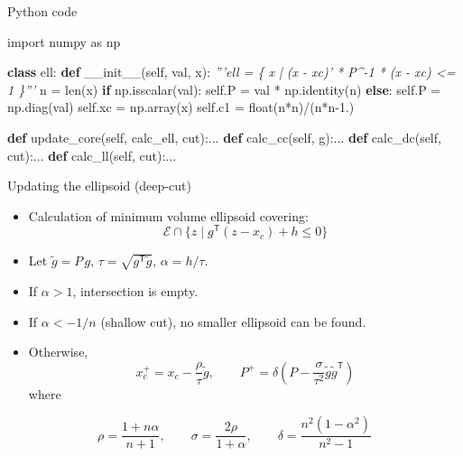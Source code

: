 \documentclass[10pt,ignorenonframetext,serif,onlymath]{beamer}
\newenvironment{Shaded}{}{}
\newcommand{\BuiltInTok}[1]{#1}
\newcommand{\CommentTok}[1]{\textcolor[rgb]{0.38,0.63,0.69}{\textit{#1}}}
\newcommand{\ControlFlowTok}[1]{\textcolor[rgb]{0.00,0.44,0.13}{\textbf{#1}}}
\newcommand{\FloatTok}[1]{\textcolor[rgb]{0.25,0.63,0.44}{#1}}
\newcommand{\FunctionTok}[1]{\textcolor[rgb]{0.02,0.16,0.49}{#1}}
\newcommand{\ImportTok}[1]{#1}
\newcommand{\KeywordTok}[1]{\textcolor[rgb]{0.00,0.44,0.13}{\textbf{#1}}}
\newcommand{\NormalTok}[1]{#1}
\newcommand{\OperatorTok}[1]{\textcolor[rgb]{0.40,0.40,0.40}{#1}}
\newcommand{\VariableTok}[1]{\textcolor[rgb]{0.10,0.09,0.49}{#1}}
\providecommand{\tightlist}{%
  \setlength{\itemsep}{0pt}\setlength{\parskip}{0pt}}
\begin{document}
\begin{frame}[fragile]{Python code}
\protect\hypertarget{sec:python-code-3}{}

\begin{Shaded}
\begin{Highlighting}[]
\ImportTok{import}\NormalTok{ numpy }\ImportTok{as}\NormalTok{ np}

\KeywordTok{class}\NormalTok{ ell:}
    \KeywordTok{def} \FunctionTok{__init__}\NormalTok{(}\VariableTok{self}\NormalTok{, val, x):}
        \CommentTok{'''ell = \{ x | (x - xc)' * P^-1 * (x - xc) <= 1 \}'''}
\NormalTok{        n }\OperatorTok{=} \BuiltInTok{len}\NormalTok{(x)}
        \ControlFlowTok{if}\NormalTok{ np.isscalar(val):}
            \VariableTok{self}\NormalTok{.P }\OperatorTok{=}\NormalTok{ val }\OperatorTok{*}\NormalTok{ np.identity(n)}
        \ControlFlowTok{else}\NormalTok{:}
            \VariableTok{self}\NormalTok{.P }\OperatorTok{=}\NormalTok{ np.diag(val)}
        \VariableTok{self}\NormalTok{.xc }\OperatorTok{=}\NormalTok{ np.array(x)}
        \VariableTok{self}\NormalTok{.c1 }\OperatorTok{=} \BuiltInTok{float}\NormalTok{(n}\OperatorTok{*}\NormalTok{n)}\OperatorTok{/}\NormalTok{(n}\OperatorTok{*}\NormalTok{n}\FloatTok{-1.}\NormalTok{)}

    \KeywordTok{def}\NormalTok{ update_core(}\VariableTok{self}\NormalTok{, calc_ell, cut):...}
    \KeywordTok{def}\NormalTok{ calc_cc(}\VariableTok{self}\NormalTok{, g):...}
    \KeywordTok{def}\NormalTok{ calc_dc(}\VariableTok{self}\NormalTok{, cut):...}
    \KeywordTok{def}\NormalTok{ calc_ll(}\VariableTok{self}\NormalTok{, cut):...}
\end{Highlighting}
\end{Shaded}

\end{frame}

\begin{frame}{Updating the ellipsoid (deep-cut)}
\protect\hypertarget{sec:updating-the-ellipsoid-deep-cut}{}

\begin{itemize}
\tightlist
\item
  Calculation of minimum volume ellipsoid covering:
  \[\mathcal{E} \cap \{z \mid g^\mathsf{T} (z - x_c) + h \leq 0 \}\]
\item
  Let \(\tilde{g} = P\,g\), \(\tau = \sqrt{g^\mathsf{T}\tilde{g}}\),
  \(\alpha = h/\tau\).
\item
  If \(\alpha > 1\), intersection is empty.
\item
  If \(\alpha < -1/n\) (shallow cut), no smaller ellipsoid can be found.
\item
  Otherwise, \[x_c^+ = x_c - \frac{\rho}{\tau} \tilde{g}, \qquad
  P^+ = \delta\left(P - \frac{\sigma}{\tau^2} \tilde{g}\tilde{g}^\mathsf{T}\right)
   \] where
\end{itemize}

\[\rho = \frac{1+n\alpha}{n+1}, \qquad
  \sigma = \frac{2\rho}{1+\alpha}, \qquad
  \delta = \frac{n^2(1-\alpha^2)}{n^2 - 1} \]

\end{frame}
\end{document}
